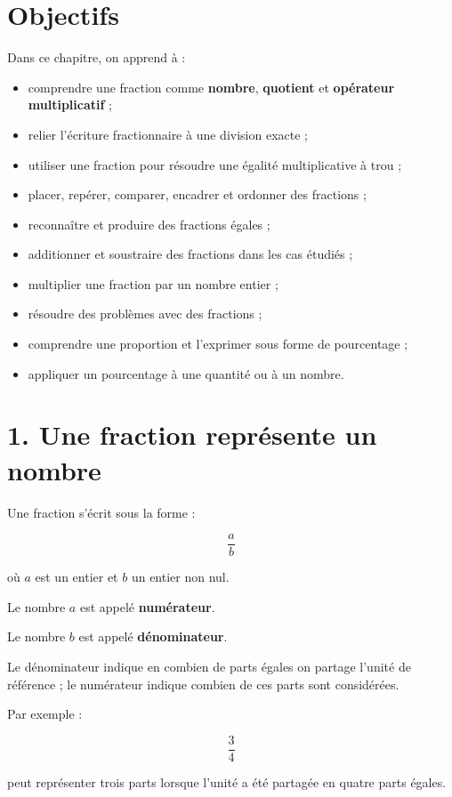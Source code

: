 
\section{Objectifs}

Dans ce chapitre, on apprend à :

\begin{itemize}
\item comprendre une fraction comme \textbf{nombre}, \textbf{quotient} et \textbf{opérateur multiplicatif} ;
\item relier l’écriture fractionnaire à une division exacte ;
\item utiliser une fraction pour résoudre une égalité multiplicative à trou ;
\item placer, repérer, comparer, encadrer et ordonner des fractions ;
\item reconnaître et produire des fractions égales ;
\item additionner et soustraire des fractions dans les cas étudiés ;
\item multiplier une fraction par un nombre entier ;
\item résoudre des problèmes avec des fractions ;
\item comprendre une proportion et l’exprimer sous forme de pourcentage ;
\item appliquer un pourcentage à une quantité ou à un nombre.
\end{itemize}

\section{1. Une fraction représente un nombre}

Une fraction s’écrit sous la forme :

\[
\dfrac{a}{b}
\]

où $a$ est un entier et $b$ un entier non nul.

Le nombre $a$ est appelé \textbf{numérateur}.

Le nombre $b$ est appelé \textbf{dénominateur}.

Le dénominateur indique en combien de parts égales on partage l’unité de référence ; le numérateur indique combien de ces parts sont considérées.

Par exemple :

\[
\dfrac{3}{4}
\]

peut représenter trois parts lorsque l’unité a été partagée en quatre parts égales.

